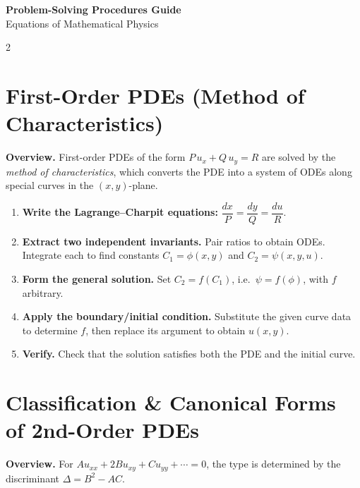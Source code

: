\documentclass[a4paper,9pt]{article}
\begin{document}
\begin{center}
{\Large\bfseries\color{secblue} Problem-Solving Procedures Guide}\\[2pt]
{\small Equations of Mathematical Physics}
\end{center}

\vspace{-2pt}

\begin{multicols}{2}

\section{First-Order PDEs (Method of Characteristics)}

\textbf{Overview.} First-order PDEs of the form $P\,u_x + Q\,u_y = R$ are solved by the \emph{method of characteristics}, which converts the PDE into a system of ODEs along special curves in the $(x,y)$-plane.

\begin{enumerate}
\item \textbf{Write the Lagrange--Charpit equations:}
$\dfrac{dx}{P} = \dfrac{dy}{Q} = \dfrac{du}{R}.$
\item \textbf{Extract two independent invariants.} Pair ratios to obtain ODEs. Integrate each to find constants $C_1 = \phi(x,y)$ and $C_2 = \psi(x,y,u)$.
\item \textbf{Form the general solution.} Set $C_2 = f(C_1)$, i.e.\ $\psi = f(\phi)$, with $f$ arbitrary.
\item \textbf{Apply the boundary/initial condition.} Substitute the given curve data to determine $f$, then replace its argument to obtain $u(x,y)$.
\item \textbf{Verify.} Check that the solution satisfies both the PDE and the initial curve.
\end{enumerate}

\section{Classification \& Canonical Forms of 2nd-Order PDEs}

\textbf{Overview.} For $Au_{xx}+2Bu_{xy}+Cu_{yy}+\cdots=0$, the type is determined by the discriminant $\Delta = B^2-AC$.


\end{multicols}
\end{document}
